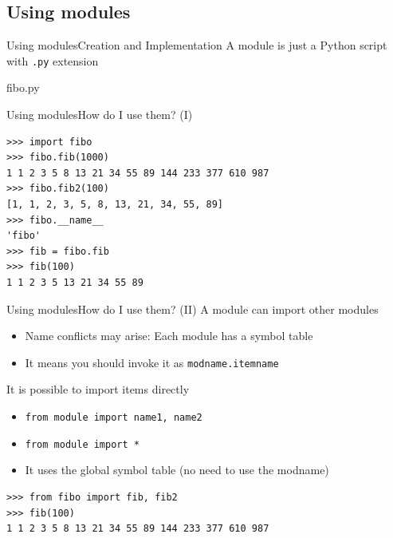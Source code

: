 \documentclass[10pt,compress]{beamer} %
\begin{document}
\subsection{Using modules}
\begin{frame}{Using modules}{Creation and Implementation}
	\vspace{-0.2cm}
	A module is just a Python script with \texttt{.py} extension
	\vspace{-0.2cm}
	\begin{exampleblock}{fibo.py}
	\vspace{-0.2cm}
	
	\vspace{-0.2cm}
	\end{exampleblock}
\end{frame}

\begin{frame}[fragile]{Using modules}{How do I use them? (I)}
	\begin{block}{}
	\begin{verbatim}
>>> import fibo
>>> fibo.fib(1000)
1 1 2 3 5 8 13 21 34 55 89 144 233 377 610 987
>>> fibo.fib2(100)
[1, 1, 2, 3, 5, 8, 13, 21, 34, 55, 89]
>>> fibo.__name__
'fibo'
>>> fib = fibo.fib
>>> fib(100)
1 1 2 3 5 13 21 34 55 89
\end{verbatim}
	\vspace{-0.2cm}
	\end{block}
\end{frame}

\begin{frame}[fragile]{Using modules}{How do I use them?  (II)}
	A module can import other modules
		\begin{itemize}
		\item Name conflicts may arise: Each module has a symbol table
		\item It means you should invoke it as \texttt{modname.itemname}
		\end{itemize}
 	It is possible to import items directly
		\begin{itemize}
		\item \texttt{from module import name1, name2}
		\item \texttt{from module import *}
		\item It uses the global symbol table (no need to use the modname)
			\end{itemize}
	
	\begin{exampleblock}{}
	\begin{verbatim}
>>> from fibo import fib, fib2
>>> fib(100)
1 1 2 3 5 8 13 21 34 55 89 144 233 377 610 987
\end{verbatim}
	\end{exampleblock}
\end{frame}
\end{document}
